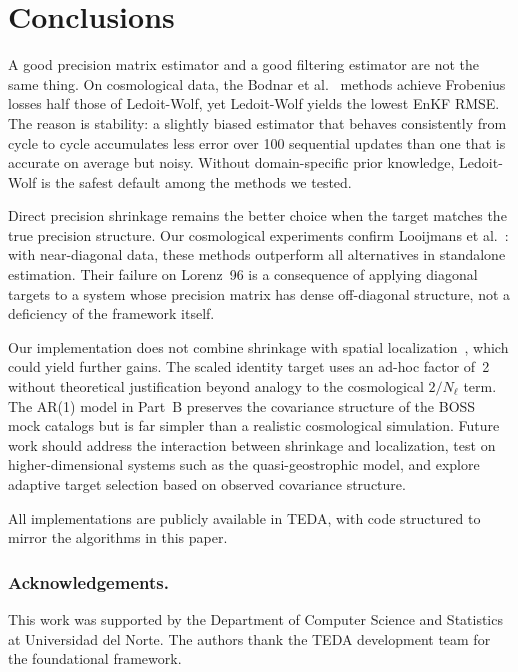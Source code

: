 \section{Conclusions}
\label{sec:conclusions}

A good precision matrix estimator and a good filtering estimator are not the same thing. On cosmological data, the Bodnar et al.~\cite{bodnar2016direct} methods achieve Frobenius losses half those of Ledoit-Wolf, yet Ledoit-Wolf yields the lowest EnKF RMSE. The reason is stability: a slightly biased estimator that behaves consistently from cycle to cycle accumulates less error over 100 sequential updates than one that is accurate on average but noisy. Without domain-specific prior knowledge, Ledoit-Wolf is the safest default among the methods we tested.

Direct precision shrinkage remains the better choice when the target matches the true precision structure. Our cosmological experiments confirm Looijmans et al.~\cite{looijmans2024comparison}: with near-diagonal data, these methods outperform all alternatives in standalone estimation. Their failure on Lorenz~96 is a consequence of applying diagonal targets to a system whose precision matrix has dense off-diagonal structure, not a deficiency of the framework itself.

Our implementation does not combine shrinkage with spatial localization~\cite{gaspari1999construction,nino2018ensemble}, which could yield further gains. The scaled identity target uses an ad-hoc factor of~2 without theoretical justification beyond analogy to the cosmological $2/N_\ell$ term. The AR(1) model in Part~B preserves the covariance structure of the BOSS mock catalogs but is far simpler than a realistic cosmological simulation. Future work should address the interaction between shrinkage and localization, test on higher-dimensional systems such as the quasi-geostrophic model, and explore adaptive target selection based on observed covariance structure.

All implementations are publicly available in TEDA, with code structured to mirror the algorithms in this paper.

\subsubsection{Acknowledgements.} This work was supported by the Department of Computer Science and Statistics at Universidad del Norte. The authors thank the TEDA development team for the foundational framework.
